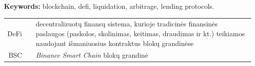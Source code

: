\documentclass[]{VUMIFTemplateClass}
\begin{document}
\textbf{Keywords:} blockchain, defi, liquidation, arbitrage, lending protocols.


\begin{tabular}{rcp{}}
    {DeFi} & {} & {decentralizuotų finansų sistema, kurioje tradicinės finansinės paslaugos (paskolos, skolinimas, keitimas, draudimas ir kt.) teikiamos naudojant išmaniuosius kontraktus blokų grandinėse} \\ 
    {BSC} & {} & {\textit{Binance Smart Chain} blokų grandinė}
\end{tabular}


\end{document}
